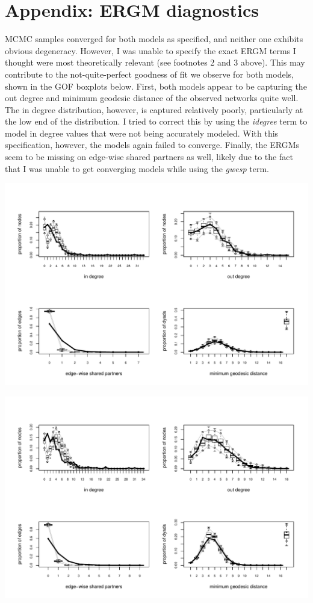 \documentclass[]{article}
\begin{document}
\pagestyle{empty} %

\newpage
\appendix

\section{Appendix: ERGM diagnostics}

MCMC samples converged for both models as specified, and neither one exhibits obvious degeneracy. However, I was unable to specify the exact ERGM terms I thought were most theoretically relevant (see footnotes 2 and 3 above). This may contribute to the not-quite-perfect goodness of fit we observe for both models, shown in the GOF boxplots below. First, both models appear to be capturing the out degree and minimum geodesic distance of the observed networks quite well. The in degree distribution, however, is captured relatively poorly, particularly at the low end of the distribution. I tried to correct this by using the \textit{idegree} term to model in degree values that were not being accurately modeled. With this specification, however, the models again failed to converge. Finally, the ERGMs seem to be missing on edge-wise shared partners as well, likely due to the fact that I was unable to get converging models while using the \textit{gwesp} term.

\includegraphics{./figures/abalang_gof.pdf}

\includegraphics{./figures/mugana_gof.pdf}
\end{document}
